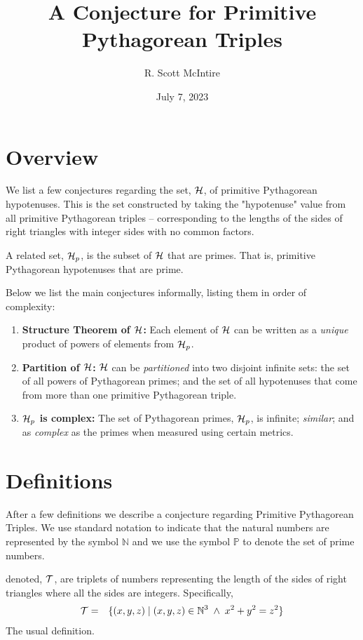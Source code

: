 \documentclass{article}
\title{A Conjecture for Primitive Pythagorean Triples}
\author{R. Scott McIntire}
\date{July 7, 2023}
\theoremstyle{definition}
\begin{document}
\maketitle


\section{Overview}
We list a few conjectures regarding the set, ${\cal H}$, of primitive Pythagorean hypotenuses. 
This is the set constructed by taking the "hypotenuse" value from all primitive Pythagorean triples -- corresponding to the lengths of the sides of 
right triangles with integer sides with no common factors.

A related set, ${\cal H}_p$, is the subset of ${\cal H}$ that are primes. That is, primitive Pythagorean hypotenuses that are prime.

Below we list the main conjectures informally, listing them in order of complexity:
\begin{enumerate}
  \item{{\bf Structure Theorem of ${\cal H}$:\/} Each element of ${\cal H}$ can be written as a {\em unique\/} product of powers of elements from ${\cal H}_p$.}
  \item{{\bf Partition of ${\cal H}$:\/} ${\cal H}$ can be {\em partitioned\/} into two disjoint infinite sets: 
    the set of all powers of Pythagorean primes; and the set of all hypotenuses that come from more than one primitive Pythagorean triple.}
  \item{{\bf ${\cal H}_p$ is complex:\/} The set of Pythagorean primes, ${\cal H}_p$, is infinite; {\em similar\/}; and as {\em complex\/} as the primes when measured using certain metrics.}
\end{enumerate}


\section{Definitions}
After a few definitions we describe a conjecture regarding Primitive Pythagorean Triples.
We use standard notation to indicate that the natural numbers are represented by the symbol $\mathbb{N}$ and 
we use the symbol $\mathbb{P}$ to denote the set of prime numbers.


 denoted, ${\cal T}$, are  triplets of numbers representing the length of the sides of
right triangles where all the sides are integers. Specifically,
\begin{eqnarray}
  {\cal T} & = & \{ (x,y,z) \; | \; (x,y,z) \in \mathbb{N}^3 \; \wedge \; x^2 + y^2 = z^2 \}
\end{eqnarray}
The usual definition.
\end{document}
